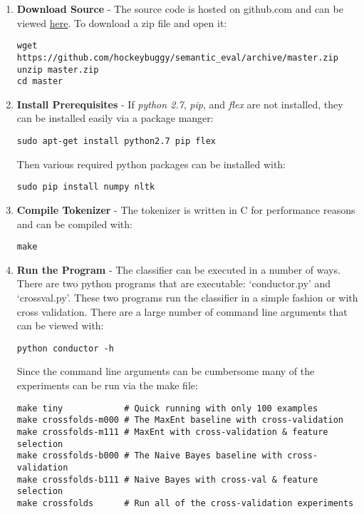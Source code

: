 \documentclass[final,3p,12pt]{elsarticle}
\begin{document}
\begin{enumerate}
    \item \textbf{Download Source} - The source code is hosted on github.com
        and can be viewed
        \href{https://github.com/hockeybuggy/semantic\_eval}{here}. To download a zip
        file and open it:

\begin{Verbatim}[fontsize=\footnotesize]
wget https://github.com/hockeybuggy/semantic_eval/archive/master.zip
unzip master.zip
cd master
\end{Verbatim}


    \item \textbf{Install Prerequisites} - If \textit{python 2.7},
        \textit{pip}, and \textit{flex} are not installed, they can be
        installed easily via a package manger:

\begin{Verbatim}[fontsize=\footnotesize]
sudo apt-get install python2.7 pip flex
\end{Verbatim}

Then various required python packages can be installed with:

\begin{Verbatim}[fontsize=\footnotesize]
sudo pip install numpy nltk
\end{Verbatim}

    \item \textbf{Compile Tokenizer} - The tokenizer is written in C for
        performance reasons and can be compiled with:
\begin{Verbatim}[fontsize=\footnotesize]
make
\end{Verbatim}

    \item \textbf{Run the Program} - The classifier can be executed in a number
        of ways. There are two python programs that are executable:
        `conductor.py' and `crossval.py'. These two programs run the classifier
        in a simple fashion or with cross validation. There are a large number
        of command line arguments that can be viewed with:

\begin{Verbatim}[fontsize=\footnotesize]
python conductor -h
\end{Verbatim}

Since the command line arguments can be cumbersome many of the experiments can
be run via the make file:

\begin{Verbatim}[fontsize=\footnotesize]
make tiny            # Quick running with only 100 examples
make crossfolds-m000 # The MaxEnt baseline with cross-validation
make crossfolds-m111 # MaxEnt with cross-validation & feature selection
make crossfolds-b000 # The Naive Bayes baseline with cross-validation
make crossfolds-b111 # Naive Bayes with cross-val & feature selection
make crossfolds      # Run all of the cross-validation experiments
\end{Verbatim}

\end{enumerate}
\end{document}
